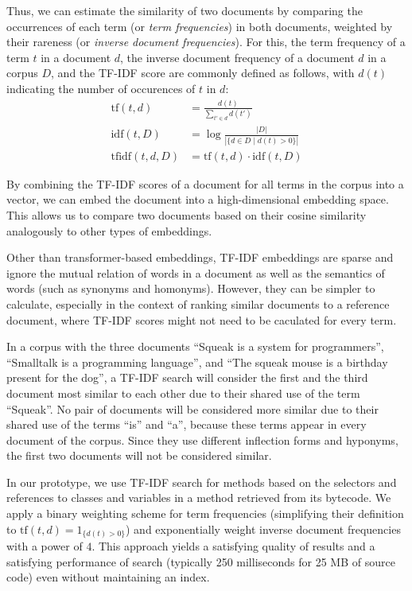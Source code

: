 Thus, we can estimate the similarity of two documents by comparing the occurrences of each term (or \emph{term frequencies}) in both documents, weighted by their rareness (or \emph{inverse document frequencies}).
For this, the term frequency of a term $t$ in a document $d$, the inverse document frequency of a document $d$ in a corpus $D$, and the TF-IDF score are commonly defined as follows, with $d(t)$ indicating the number of occurences of $t$ in $d$:
\begin{align}
	\text{tf}(t, d)	&= \frac{d(t)}{\sum_{t' \in d} d(t')} \\
	\text{idf}(t, D)	&= \log \frac{|D|}{|\{d \in D \mid d(t) > 0\}|} \\
	\text{tfidf}(t, d, D)	&= \text{tf}(t, d) \cdot \text{idf}(t, D)
\end{align}

By combining the TF-IDF scores of a document for all terms in the corpus into a vector, we can embed the document into a high-dimensional embedding space.
This allows us to compare two documents based on their cosine similarity analogously to other types of embeddings.

Other than transformer-based embeddings, TF-IDF embeddings are sparse and ignore the mutual relation of words in a document as well as the semantics of words (such as synonyms and homonyms).
However, they can be simpler to calculate, especially in the context of ranking similar documents to a reference document, where TF-IDF scores might not need to be caculated for every term.

\begin{example}
	In a corpus with the three documents ``Squeak is a system for programmers'', ``Smalltalk is a programming language'', and ``The squeak mouse is a birthday present for the dog'', a TF-IDF search will consider the first and the third document most similar to each other due to their shared use of the term ``Squeak''.
	No pair of documents will be considered more similar due to their shared use of the terms ``is'' and ``a'', because these terms appear in every document of the corpus.
	Since they use different inflection forms and hyponyms, the first two documents will not be considered similar.
\end{example}

In our prototype, we use TF-IDF search for methods based on the selectors and references to classes and variables in a method retrieved from its bytecode.
We apply a binary weighting scheme for term frequencies (simplifying their definition to $\text{tf}(t, d) = 1_{\{d(t) > 0\}}$) and exponentially weight inverse document frequencies with a power of $4$.
This approach yields a satisfying quality of results and a satisfying performance of search (typically 250 milliseconds for 25 MB of source code) even without maintaining an index.

